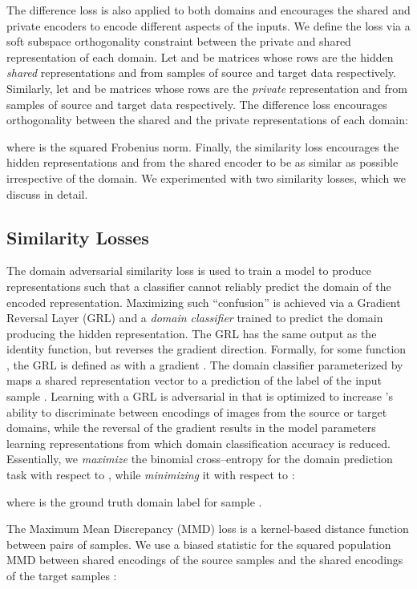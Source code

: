 \documentclass{article}
\begin{document}
The difference loss is also applied to both domains and encourages the
shared and private encoders to encode different aspects of the inputs. We define
the loss via a soft subspace orthogonality constraint between the
private and shared representation of each domain. Let  and  
be matrices whose rows are the hidden \textit{shared} representations
 and  from samples of source
and target data respectively. Similarly, let  and  be matrices
whose rows are the \textsl{private} representation  and
 from samples of source and target data respectively. The
difference loss encourages orthogonality between the shared and the private
representations of each domain:

where  is the squared Frobenius norm.
Finally, the similarity loss encourages the hidden
representations  and  from the shared encoder to be as
similar as possible irrespective of the domain. We experimented with two similarity losses, which we discuss in detail.



\subsection{Similarity Losses}
\label{sec:similarity_loss}
The domain adversarial similarity loss \cite{ganin2014unsupervised,ganin2016domain}
is used to train a model to produce representations such that a classifier cannot
reliably predict the domain of the encoded representation.
Maximizing such ``confusion'' is achieved via a Gradient Reversal Layer (GRL)
and a \textit{domain classifier} trained to predict the domain producing the
hidden representation.
The GRL has the same output as the identity function,
but reverses the gradient direction. Formally, for some function , the GRL
is defined as  with a gradient .
The domain classifier 
parameterized by  maps a shared representation vector
 to a prediction of the label  of the
input sample . Learning with a GRL is adversarial in that  is
optimized to increase 's ability to discriminate between encodings of images from
the source or target domains, while the reversal of the gradient results in the model
parameters  learning representations from which domain classification
accuracy is reduced.
Essentially, we \textsl{maximize} the binomial cross--entropy for the domain prediction task with respect to , while \textsl{minimizing} it with respect to : 


where  is the ground truth domain label for sample .

The Maximum Mean Discrepancy (MMD) loss \cite{gretton2012mmd} is a kernel-based
distance function between pairs of samples.
We use a biased statistic for the squared population MMD between shared encodings of the source samples  and the shared encodings of the target samples :
\end{document}
